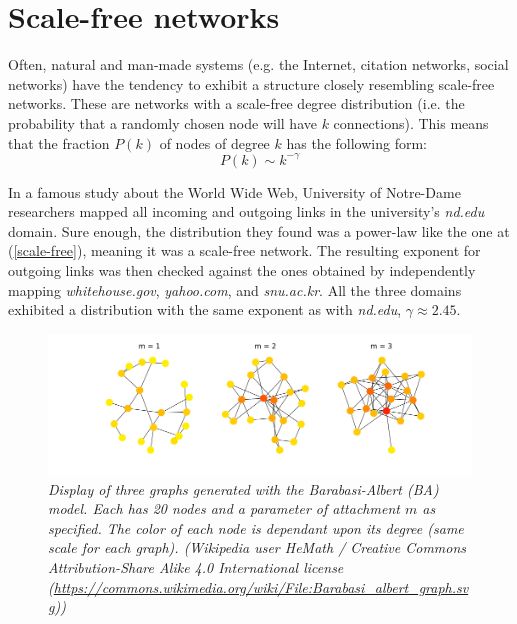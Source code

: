 \documentclass[12pt,openright,twoside]{book}
\begin{document}
\section{Scale-free networks}

Often, natural and man-made systems (e.g. the Internet, citation networks, social networks) have the tendency to exhibit a structure closely resembling scale-free networks\cite{barabasi_2002}. These are networks with a scale-free degree distribution (i.e. the probability that a randomly chosen node will have  $k$ connections). This means that the fraction $P(k)$ of nodes of degree $k$ has the following form:\\

\begin{equation}
P(k) \sim k^{-\gamma}
\label{scale-free}
\end{equation}

\vspace{14pt}

In a famous study about the World Wide Web, University of Notre-Dame researchers mapped all incoming and outgoing links in the university's \textit{nd.edu} domain\cite{barabasi_albert_jeong_2000}. Sure enough, the distribution they found was a power-law like the one at (\ref{scale-free}), meaning it was a scale-free network. The resulting exponent for outgoing links was then checked against the ones obtained by independently mapping \textit{whitehouse.gov}, \textit{yahoo.com}, and \textit{snu.ac.kr}. All the three domains exhibited a distribution with the same exponent as with \textit{nd.edu}, $\gamma\approx2.45$.\\

\begin{figure}[!htb]
\centering
\includegraphics[width=\linewidth]{figures/1000px-Barabasi_albert_graph.png}
\caption{\textit{{\small Display of three graphs generated with the Barabasi-Albert (BA) model. Each has 20 nodes and a parameter of attachment $m$ as specified. The color of each node is dependant upon its degree (same scale for each graph). (Wikipedia user HeMath / Creative Commons Attribution-Share Alike 4.0 International license (\url{https://commons.wikimedia.org/wiki/File:Barabasi_albert_graph.svg}))}}}
\label{barabasi-graph}
\end{figure}
\end{document}

